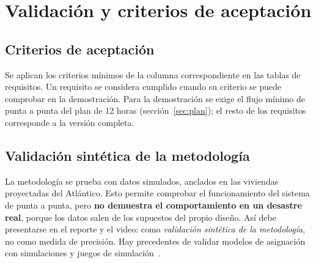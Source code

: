 \section{Validación y criterios de aceptación}\label{sec:validacion}

\subsection{Criterios de aceptación}
Se aplican los criterios mínimos de la columna correspondiente en las tablas de requisitos. Un requisito se considera cumplido cuando su criterio se puede comprobar en la demostración. Para la demostración se exige el flujo mínimo de punta a punta del plan de 12 horas (sección~\ref{sec:plan}); el resto de los requisitos \Must{} corresponde a la versión completa.

\subsection{Validación sintética de la metodología}
La metodología se prueba con datos simulados, anclados en las viviendas proyectadas del Atlántico. Esto permite comprobar el funcionamiento del sistema de punta a punta, pero \textbf{no demuestra el comportamiento en un desastre real}, porque los datos salen de los supuestos del propio diseño. Así debe presentarse en el reporte y el video: como \emph{validación sintética de la metodología}, no como medida de precisión. Hay precedentes de validar modelos de asignación con simulaciones y juegos de simulación~\cite{Hasani201672}.


